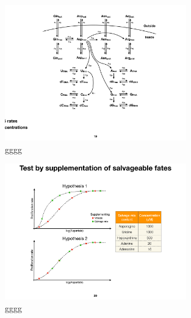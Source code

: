 \begin{figure}
    \centering
    \includegraphics[width=0.70\textwidth]{figures/chap1/asp_fluxes.pdf}
    \caption[Aspartate metabolism fluxes]{
    gggg
    }
    \label{fig:ch1:asp_fluxes}
\end{figure}



\begin{figure}
    \centering
    \includegraphics[width=0.70\textwidth]{figures/chap1/asp_fates_suppl_hypo.pdf}
    \caption[Two hypotheses for aspartate to proliferation correlation]{
    gggg
    }
    \label{fig:ch1:asp_fates_suppl_hypo}
\end{figure}









